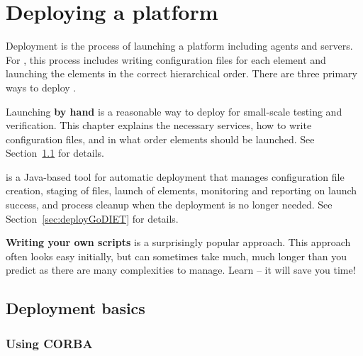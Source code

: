 
\chapter{Deploying a \diet platform}
\label{ch:deploying}

Deployment is the process of launching a \diet platform including agents and
servers.  For \diet, this process includes writing configuration files for each
element and launching the elements in the correct hierarchical order. There are
three primary ways to deploy \diet.

Launching \textbf{by hand} is a reasonable way to deploy \diet for small-scale
testing and verification. This chapter explains the  necessary services, how to
write \diet configuration files, and in what order \diet elements should be
launched.  See Section~\ref{sec:deployBasics} for details.

\textbf{\godiet} is a Java-based tool for automatic \diet deployment that
manages configuration file creation, staging of files, launch of elements,
monitoring and reporting on launch success, and process cleanup when the \diet
deployment is no longer needed.   See  Section~\ref{sec:deployGoDIET} for
details.

\textbf{Writing your own scripts} is a surprisingly popular approach.  This
approach often looks easy initially, but can sometimes take much, much longer
than you predict as there are many complexities to manage.  Learn \godiet -- it
will save you time!



\section{Deployment basics}
\label{sec:deployBasics}

\subsection{Using CORBA} 
\label{sec:CORBA_services}

